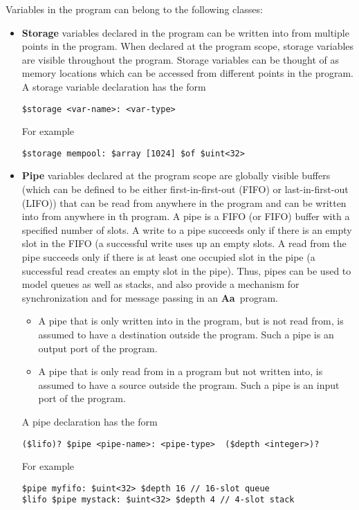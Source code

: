 \documentclass{article}
\newcommand{\Aa}{{\bf Aa}~}
\begin{document}
Variables in  the program can belong to the following classes:
\begin{itemize}
\item {\bf Storage} variables declared in the program
can be written into from multiple
points in the program.  When declared at the program
scope, storage variables are visible throughout
the program.  Storage variables can be thought of 
as memory locations which can be accessed from different
points in the program.
A storage variable declaration has the form
\begin{verbatim}
$storage <var-name>: <var-type> 
\end{verbatim}
For example
\begin{verbatim}
$storage mempool: $array [1024] $of $uint<32>
\end{verbatim}
\item {\bf Pipe} variables declared at the program scope
are globally visible buffers (which
can be defined to be either first-in-first-out (FIFO) or
last-in-first-out (LIFO)) that can 
be read from anywhere in the program and can be
written into from anywhere in th program.  A pipe
is a FIFO (or FIFO) buffer with a specified number of
slots.  A write to a pipe succeeds
only if there is an empty slot in the FIFO (a successful
write uses up an empty slots.  A read
from the pipe succeeds only if there is at
least one occupied slot in the pipe (a successful read
creates an empty slot in the pipe). 
Thus, pipes can be used to model queues as
well as stacks, and also provide a mechanism for synchronization and
for message passing in an \Aa program.
\begin{itemize}
\item A pipe that is only written into in the program, but
is not read from, is assumed to have a destination outside
the program.  Such a pipe is an output port of the
program.
\item A pipe that is only read from in a program but not
written into, is assumed to have a source outside the program.
Such a pipe is an input port of the program.
\end{itemize}
A pipe declaration has the form
\begin{verbatim}
($lifo)? $pipe <pipe-name>: <pipe-type>  ($depth <integer>)?
\end{verbatim}
For example
\begin{verbatim}
$pipe myfifo: $uint<32> $depth 16 // 16-slot queue
$lifo $pipe mystack: $uint<32> $depth 4 // 4-slot stack
\end{verbatim}

\end{itemize}
\end{document}
